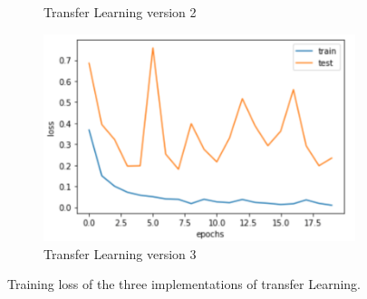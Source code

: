 \begin{figure}[h]
\begin{subfigure}[b]{0.48\linewidth}
   \caption{Transfer Learning version 2}
   \label{fig:tri_loss}
  \end{subfigure}
    \hfill
    \begin{subfigure}[b]{0.48\linewidth}
   \includegraphics[width=\linewidth]{figs/transfer_loss_3.png}
   \caption{Transfer Learning version 3}
   \label{fig:tri_loss_2}
  \end{subfigure}
  \hfill
    \caption{Training loss of the three implementations of transfer Learning.}
    \label{fig:tertrainloss}
\end{figure}


